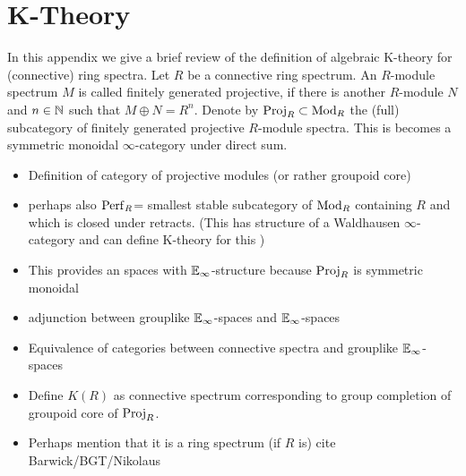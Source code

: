 \appendix
\chapter{K-Theory}
In this appendix we give a brief review of the definition of algebraic K-theory for (connective) ring spectra.
Let $R$ be a connective ring spectrum.
An $R$-module spectrum $M$ is called finitely generated projective, if there is another $R$-module $N$ and  $n\in\mathbb{N}$ such that $M\oplus N=R^n$.
Denote by $\operatorname{Proj}_R\subset \operatorname{Mod}_R$ the (full) subcategory of finitely generated projective $R$-module spectra. This is becomes a symmetric monoidal $\infty$-category under direct sum.
\begin{itemize}
    \item Definition of category of projective modules (or rather groupoid core) 
    \item perhaps also $\operatorname{Perf}_R$= smallest stable subcategory of $\operatorname{Mod}_R$ containing $R$ and which is closed under retracts. (This has structure of a Waldhausen $\infty$-category and can define K-theory for this \cite{barwickK-theory})
    \item This provides an spaces with $\mathbb{E}_\infty$-structure because $\operatorname{Proj}_R$ is symmetric monoidal
    \item adjunction between grouplike $\mathbb{E}_\infty$-spaces and $\mathbb{E}_\infty$-spaces 
    \item Equivalence of categories between connective spectra and grouplike $\mathbb{E}_\infty$-spaces
    \item Define $K(R)$ as connective spectrum corresponding to group completion of groupoid core of $\operatorname{Proj}_R$.
    \item Perhaps mention that it is a ring spectrum (if $R$ is) cite Barwick/BGT/Nikolaus \cite[Section~8]{GGNuniversalityloop} \cite{BGTuniquenessmulti}
\end{itemize}